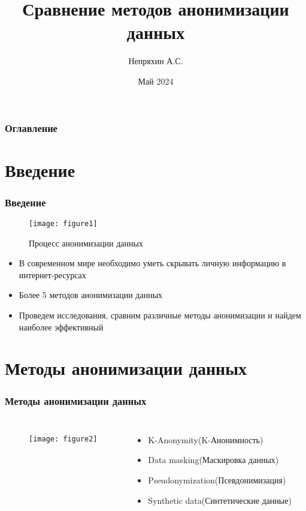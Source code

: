 \documentclass[russian]{beamer}
\title{Сравнение методов анонимизации данных}
\author{Непряхин А.С.}
\date{Май 2024}
\begin{document}
\maketitle

\begin{frame}
    \frametitle{Оглавление}
    \tableofcontents
\end{frame}

\section{Введение}
\begin{frame}
    \frametitle{Введение}
    
     \begin{figure}[ht!]
       \texttt{[image: figure1]}
       \caption{Процесс анонимизации данных}
       \label{fig:1}
   \end{figure}
   
    \begin{itemize}
        \item В современном мире необходимо уметь скрывать личную информацию в интернет-ресурсах
        \item Более 5 методов анонимизации данных
        \item Проведем исследования, сравним различные методы анонимизации и найдем наиболее эффективный
    \end{itemize}
\end{frame}

\section{Методы анонимизации данных}
\begin{frame}
    \frametitle{Методы анонимизации данных}

    \begin{columns}
        \begin{figure}[ht!]
       \texttt{[image: figure2]}
       \label{fig:2}
   \end{figure}

       \begin{itemize}
       \pause
        \item K-Anonymity(K-Анонимность)
        \pause
        \item Data masking(Маскировка данных)
        \pause
        \item Pseudonymization(Псевдонимизация)
        \pause
        \item Synthetic data(Синтетические данные)
    \end{itemize}
    \end{columns}
\end{frame}
\end{document}
